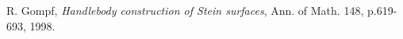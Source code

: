 \documentclass[11pt]{amsart}
\begin{document}
\begin{thebibliography}{}
\begin{comment}
\bibitem[G02]{Giroux:ContactOB}
E. Giroux, \textit{G\'{e}om\'{e}trie de contact: de la dimension trois vers les dimensions sup\'{e}rieures}, Proceedings of the International Congress of Mathematicians, Vol. II, Higher Ed. Press, Beijing, p.405-414, 2002.

\bibitem[Girou17]{Giroux:IdealLiouville}
E. Giroux, \textit{Ideal Liouville Domains - a cool gadget}, J. Symplectic Geom., Volume 18, p.769–790, 2017.

\bibitem[GP17]{GirouxPardon}
E. Giroux and J. Pardon, \textit{Existence of Lefschetz fibrations on Stein and Weinstein domains}, Geom. Topol., 21, no. 2, 963–997, 2017.
\end{comment}

R. Gompf, \textit{Handlebody construction of Stein surfaces}, Ann. of Math. 148,
p.619-693, 1998.

\begin{comment}

\bibitem[GS99]{GS:KirbyCalculus}
R. Gopf and A. Stipsicz, \textit{4-manifolds and Kirby Calculus}, Graduate Studies in Mathematics 20, Amer. Math. Society, Providence, RI, 1999.

\bibitem[Gr85]{Gromov:JCurves}
M. Gromov, \textit{Pseudoholomorphic curves in symplectic manifolds}, Invent. Math, Volume 82, p.307–347, 1985.


\bibitem[G14]{Gutt:Normal}
J. Gutt, \textit{Normal Forms for Symplectic Matrices}, Portugalia Mathematicae, vol. 71, p.109-139, 2014.



\bibitem[Ha02]{Hatcher:AlgebraicTopology}
A. Hatcher, \textit{Algebraic topology}, Cambridge University Press, Cambridge, 2002.

\bibitem[HW]{HW:Cop}
N. Higstons, N. Wahl, {\em Products and coproducts in string topology}, arXiv:1709.06839v1, 2017.

\bibitem[Hi03]{Hind:Filling}
R. Hind, \textit{Stein fillings of lens spaces}, Commun. Contemp. Math. 5, no. 6, p.967–982, 2003.

\bibitem[Hof93]{Hofer:OTWeinstein}
H. Hofer, \textit{Pseudoholomorphic curves in symplectizations with applications to the Weinstein conjecture in dimension three}, Inv. Math., Volume 114, p.515-563, 1993.


\bibitem[HWZ96]{HWZ:Asymptotics}
H. Hofer, K. Wysocki and E. Zehnder, \textit{Properties of pseudoholomorphic curves in symplectizations I: Asymptotics}, Ann. Inst. H. Poincar{`e} Anal. Non Lin{`e}aire 13, p.337–37, 1996.


\end{comment}
\end{thebibliography}
\end{document}
